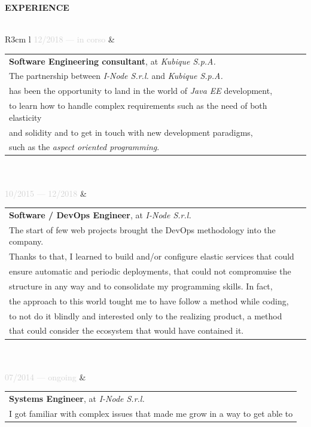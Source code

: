 \documentclass{article}
\begin{document}
\textbf{\textcolor{deepblue}{EXPERIENCE}} \\\\ \hfill
\begin{tabular}{ R{3cm} l }
	\textcolor{lightgray}{12/2018 — in corso} & \begin{tabular}[l]{@{}l@{}}
		\textbf{Software Engineering consultant}, at \textit{Kubique S.p.A.} \\
		The partnership between \textit{I-Node S.r.l.} and \textit{Kubique S.p.A.} \\
		has been the opportunity to land in the world of \textit{Java EE} development, \\
		to learn how to handle complex requirements such as the need of both elasticity \\
		and solidity and to get in touch with new development paradigms, \\
		such as the \textit{aspect oriented programming}.
	\end{tabular} \\\\ \hfill
	\textcolor{lightgray}{10/2015 — 12/2018} & \begin{tabular}[l]{@{}l@{}}
		\textbf{Software / DevOps Engineer}, at \textit{I-Node S.r.l.} \\
		The start of few web projects brought the DevOps methodology into the company. \\
		Thanks to that, I learned to build and/or configure elastic services that could \\
		ensure automatic and periodic deployments, that could not compromuise the \\
		structure in any way and to consolidate my programming skills. In fact, \\
		the approach to this world tought me to have follow a method while coding, \\
		to not do it blindly and interested only to the realizing product, a method \\
		that could consider the ecosystem that would have contained it.
	\end{tabular} \\\\ \hfill
	\textcolor{lightgray}{07/2014 — ongoing}   & \begin{tabular}[l]{@{}l@{}}
		\textbf{Systems Engineer}, at \textit{I-Node S.r.l.} \\
		I got familiar with complex issues that made me grow in a way to get able to \\

\end{tabular}
\end{tabular}
\end{document}

